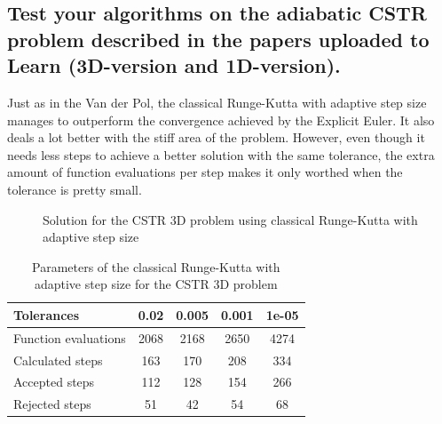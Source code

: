 \pagebreak

\subsection{Test  your  algorithms  on  the  adiabatic  CSTR  problem  described  in  the papers uploaded to Learn (3D-version and 1D-version).}
Just as in the Van der Pol, the classical Runge-Kutta with adaptive step size manages to outperform the convergence achieved by the Explicit Euler. It also deals a lot better with the stiff area of the problem. However, even though it needs less steps to achieve a better solution with the same tolerance, the extra amount of function evaluations per step makes it only worthed when the tolerance is pretty small.

\begin{figure}[H]
    \centering
    \caption{Solution for the CSTR 3D problem using classical Runge-Kutta with adaptive step size}
    \label{6_5_3D_tols}
\end{figure}

\begin{table}[H]
    \centering
    \begin{tabular}{@{}l|cccc@{}}
    \toprule
    Tolerances           & 0.02 & 0.005 & 0.001 & 1e-05 \\ \midrule
    Function evaluations & 2068 & 2168  & 2650  & 4274  \\
    Calculated steps     & 163  & 170   & 208   & 334   \\
    Accepted steps       & 112  & 128   & 154   & 266   \\
    Rejected steps       & 51   & 42    & 54    & 68    \\ \bottomrule
    \end{tabular}
    \caption{Parameters of the classical Runge-Kutta with adaptive step size for the CSTR 3D problem}
    \label{6_5_3D_tols_table}
\end{table}

